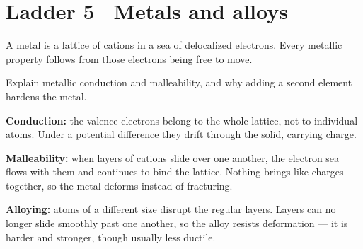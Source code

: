 \documentclass{apchem-worksheet}
\begin{document}
\section*{\sffamily Ladder 5 \textbullet\ Metals and alloys}

A metal is a lattice of cations in a sea of delocalized electrons. Every
metallic property follows from those electrons being free to move.

\begin{workedexample}
Explain metallic conduction and malleability, and why adding a second
element hardens the metal.

\textbf{Conduction:} the valence electrons belong to the whole lattice,
not to individual atoms. Under a potential difference they drift through
the solid, carrying charge.

\textbf{Malleability:} when layers of cations slide over one another, the
electron sea flows with them and continues to bind the lattice. Nothing
brings like charges together, so the metal deforms instead of fracturing.

\textbf{Alloying:} atoms of a different size disrupt the regular layers.
Layers can no longer slide smoothly past one another, so the alloy resists
deformation --- it is harder and stronger, though usually less ductile.
\end{workedexample}
\end{document}
